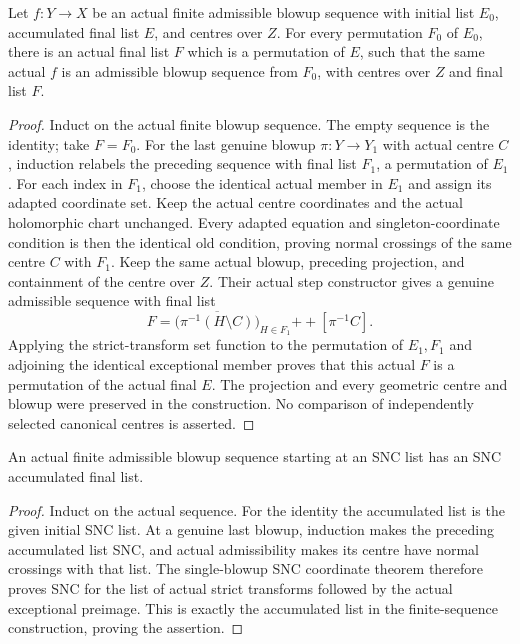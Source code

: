 \begin{theorem}
\label{hir:nc-actual-sequence-permutation}
\leanok
Let $f:Y\to X$ be an actual finite admissible blowup sequence with
initial list $E_0$, accumulated final list $E$, and centres over $Z$.
For every permutation $F_0$ of $E_0$, there is an actual final list
$F$ which is a permutation of $E$, such that the same actual $f$
is an admissible blowup sequence from $F_0$, with centres over $Z$
and final list $F$.
\end{theorem}
\begin{proof}
Induct on the actual finite blowup sequence.  The empty sequence is
the identity; take $F=F_0$.  For the last genuine blowup
$\pi:Y\to Y_1$ with actual centre $C$, induction relabels the
preceding sequence with final list $F_1$, a permutation of $E_1$.
For each index in $F_1$, choose the identical actual member
in $E_1$ and assign its adapted coordinate set.  Keep the actual
centre coordinates and the actual holomorphic chart unchanged.
Every adapted equation and singleton-coordinate condition is then
the identical old condition, proving normal crossings of the same
centre $C$ with $F_1$.  Keep the same actual blowup, preceding projection, and
containment of the centre over $Z$.  Their actual step constructor
gives a genuine admissible sequence with final list
\[
 F=\bigl(\overline{\pi^{-1}(H\setminus C)}\bigr)_{H\in F_1}
       \mathbin{+\!+}[\pi^{-1}C].
\]
Applying the strict-transform set function to the permutation of
$E_1,F_1$ and adjoining the identical exceptional member proves
that this actual $F$ is a permutation of the actual final $E$.
The projection and every geometric centre and blowup were preserved
in the construction.  No comparison of independently selected
canonical centres is asserted.
\end{proof}

\begin{lemma}
\label{hir:nc-actual-sequence-preserves-snc}
\leanok
An actual finite admissible blowup sequence starting at an SNC list
has an SNC accumulated final list.
\end{lemma}
\begin{proof}
Induct on the actual sequence.  For the identity the accumulated
list is the given initial SNC list.  At a genuine last blowup,
induction makes the preceding accumulated list SNC, and actual
admissibility makes its centre have normal crossings with that list.
The single-blowup SNC coordinate theorem therefore proves SNC
for the list of actual strict transforms followed by the actual
exceptional preimage.  This is exactly the accumulated list in
the finite-sequence construction, proving the assertion.
\end{proof}

